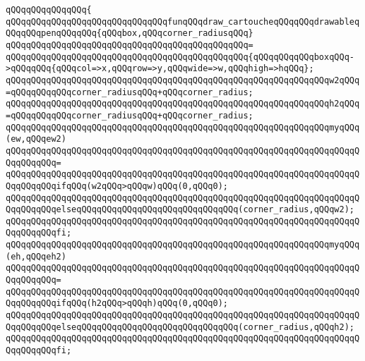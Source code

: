 \verb|qQQqqQQqqQQqqQQq{|\newline
\verb|qQQqqQQqqQQqqQQqqQQqqQQqqQQqqQQqfunqQQqdraw_cartoucheqQQqqQQqdrawableqQQqqQQqpenqQQqqQQq{qQQqbox,qQQqcorner_radiusqQQq}|\newline
\verb|qQQqqQQqqQQqqQQqqQQqqQQqqQQqqQQqqQQqqQQqqQQqqQQq=|\newline
\verb|qQQqqQQqqQQqqQQqqQQqqQQqqQQqqQQqqQQqqQQqqQQqqQQq{qQQqqQQqqQQqboxqQQq->qQQqqQQq{qQQqcol=>x,qQQqrow=>y,qQQqwide=>w,qQQqhigh=>hqQQq};|\newline
\newline
\verb|qQQqqQQqqQQqqQQqqQQqqQQqqQQqqQQqqQQqqQQqqQQqqQQqqQQqqQQqqQQqqQQqw2qQQq=qQQqqQQqqQQqcorner_radiusqQQq+qQQqcorner_radius;|\newline
\verb|qQQqqQQqqQQqqQQqqQQqqQQqqQQqqQQqqQQqqQQqqQQqqQQqqQQqqQQqqQQqqQQqh2qQQq=qQQqqQQqqQQqcorner_radiusqQQq+qQQqcorner_radius;|\newline
\newline
\verb|qQQqqQQqqQQqqQQqqQQqqQQqqQQqqQQqqQQqqQQqqQQqqQQqqQQqqQQqqQQqqQQqmyqQQq(ew,qQQqew2)|\newline
\verb|qQQqqQQqqQQqqQQqqQQqqQQqqQQqqQQqqQQqqQQqqQQqqQQqqQQqqQQqqQQqqQQqqQQqqQQqqQQqqQQq=|\newline
\verb|qQQqqQQqqQQqqQQqqQQqqQQqqQQqqQQqqQQqqQQqqQQqqQQqqQQqqQQqqQQqqQQqqQQqqQQqqQQqqQQqifqQQq(w2qQQq>qQQqw)qQQq(0,qQQq0);|\newline
\verb|qQQqqQQqqQQqqQQqqQQqqQQqqQQqqQQqqQQqqQQqqQQqqQQqqQQqqQQqqQQqqQQqqQQqqQQqqQQqqQQqelseqQQqqQQqqQQqqQQqqQQqqQQqqQQqqQQq(corner_radius,qQQqw2);|\newline
\verb|qQQqqQQqqQQqqQQqqQQqqQQqqQQqqQQqqQQqqQQqqQQqqQQqqQQqqQQqqQQqqQQqqQQqqQQqqQQqqQQqfi;|\newline
\newline
\verb|qQQqqQQqqQQqqQQqqQQqqQQqqQQqqQQqqQQqqQQqqQQqqQQqqQQqqQQqqQQqqQQqmyqQQq(eh,qQQqeh2)|\newline
\verb|qQQqqQQqqQQqqQQqqQQqqQQqqQQqqQQqqQQqqQQqqQQqqQQqqQQqqQQqqQQqqQQqqQQqqQQqqQQqqQQq=|\newline
\verb|qQQqqQQqqQQqqQQqqQQqqQQqqQQqqQQqqQQqqQQqqQQqqQQqqQQqqQQqqQQqqQQqqQQqqQQqqQQqqQQqifqQQq(h2qQQq>qQQqh)qQQq(0,qQQq0);|\newline
\verb|qQQqqQQqqQQqqQQqqQQqqQQqqQQqqQQqqQQqqQQqqQQqqQQqqQQqqQQqqQQqqQQqqQQqqQQqqQQqqQQqelseqQQqqQQqqQQqqQQqqQQqqQQqqQQqqQQq(corner_radius,qQQqh2);|\newline
\verb|qQQqqQQqqQQqqQQqqQQqqQQqqQQqqQQqqQQqqQQqqQQqqQQqqQQqqQQqqQQqqQQqqQQqqQQqqQQqqQQqfi;|\newline
\newline
